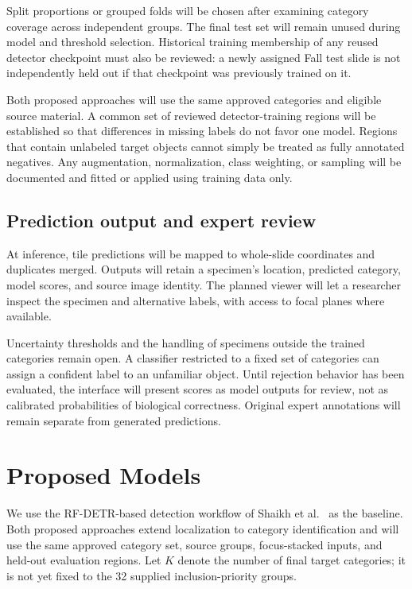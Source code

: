 \documentclass[11pt,letterpaper]{article}
\begin{document}
Split proportions or grouped folds will be chosen after examining category coverage across independent groups. The final test set will remain unused during model and threshold selection. Historical training membership of any reused detector checkpoint must also be reviewed: a newly assigned Fall test slide is not independently held out if that checkpoint was previously trained on it.

Both proposed approaches will use the same approved categories and eligible source material. A common set of reviewed detector-training regions will be established so that differences in missing labels do not favor one model. Regions that contain unlabeled target objects cannot simply be treated as fully annotated negatives. Any augmentation, normalization, class weighting, or sampling will be documented and fitted or applied using training data only.

\subsection{Prediction output and expert review}
At inference, tile predictions will be mapped to whole-slide coordinates and duplicates merged. Outputs will retain a specimen's location, predicted category, model scores, and source image identity. The planned viewer will let a researcher inspect the specimen and alternative labels, with access to focal planes where available.

Uncertainty thresholds and the handling of specimens outside the trained categories remain open. A classifier restricted to a fixed set of categories can assign a confident label to an unfamiliar object. Until rejection behavior has been evaluated, the interface will present scores as model outputs for review, not as calibrated probabilities of biological correctness. Original expert annotations will remain separate from generated predictions.

\section{Proposed Models}
We use the RF-DETR-based detection workflow of Shaikh et al.\ \citep{shaikh2026} as the baseline. Both proposed approaches extend localization to category identification and will use the same approved category set, source groups, focus-stacked inputs, and held-out evaluation regions. Let $K$ denote the number of final target categories; it is not yet fixed to the 32 supplied inclusion-priority groups.
\end{document}
